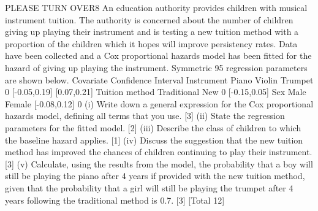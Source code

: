 \documentclass[a4paper,12pt]{article}
\begin{document}
\begin{enumerate}
PLEASE TURN OVER8
An education authority provides children with musical instrument tuition. The
authority is concerned about the number of children giving up playing their
instrument and is testing a new tuition method with a proportion of the children which
it hopes will improve persistency rates. Data have been collected and a Cox
proportional hazards model has been fitted for the hazard of giving up playing the
instrument. Symmetric 95%
regression parameters are shown below.
Covariate
Confidence Interval
Instrument
Piano
Violin
Trumpet 0
[-0.05,0.19]
[0.07,0.21]
Tuition method
Traditional
New 0
[-0.15,0.05]
Sex
Male
Female
[-0.08,0.12]
0
(i) Write down a general expression for the Cox proportional hazards model,
defining all terms that you use.
[3]
(ii) State the regression parameters for the fitted model. [2]
(iii) Describe the class of children to which the baseline hazard applies. [1]
(iv) Discuss the suggestion that the new tuition method has improved the chances
of children continuing to play their instrument.
[3]
(v) Calculate, using the results from the model, the probability that a boy will still
be playing the piano after 4 years if provided with the new tuition method,
given that the probability that a girl will still be playing the trumpet after 4
years following the traditional method is 0.7.
[3]
[Total 12]



\end{enumerate}
\end{document}
